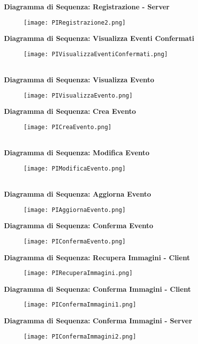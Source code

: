 \textbf{Diagramma di Sequenza: Registrazione - Server}
\begin{figure}[h!]
    \centering
    \texttt{[image: PIRegistrazione2.png]}
\end{figure}
\clearpage
\textbf{Diagramma di Sequenza: Visualizza Eventi Confermati}
\begin{figure}[h!]
    \centering
    \texttt{[image: PIVisualizzaEventiConfermati.png]}
\end{figure}\\
\textbf{Diagramma di Sequenza: Visualizza Evento}
\begin{figure}[h!]
    \centering
    \texttt{[image: PIVisualizzaEvento.png]}
\end{figure}
\clearpage
\textbf{Diagramma di Sequenza: Crea Evento}
\begin{figure}[h!]
    \centering
    \texttt{[image: PICreaEvento.png]}
\end{figure}\\
\textbf{Diagramma di Sequenza: Modifica Evento}
\begin{figure}[h!]
    \centering
    \texttt{[image: PIModificaEvento.png]}
\end{figure}\\
\textbf{Diagramma di Sequenza: Aggiorna Evento}
\begin{figure}[h!]
    \centering
    \texttt{[image: PIAggiornaEvento.png]}
\end{figure}
\clearpage
\textbf{Diagramma di Sequenza: Conferma Evento}
\begin{figure}[h!]
    \centering
    \texttt{[image: PIConfermaEvento.png]}
\end{figure}

\textbf{Diagramma di Sequenza: Recupera Immagini - Client}
\begin{figure}[h!]
    \centering
    \texttt{[image: PIRecuperaImmagini.png]}
\end{figure}
\clearpage

\textbf{Diagramma di Sequenza: Conferma Immagini - Client}
\begin{figure}[h!]
    \centering
    \texttt{[image: PIConfermaImmagini1.png]}
\end{figure}

\textbf{Diagramma di Sequenza: Conferma Immagini - Server}
\begin{figure}[h!]
    \centering
    \texttt{[image: PIConfermaImmagini2.png]}
\end{figure}
\clearpage

